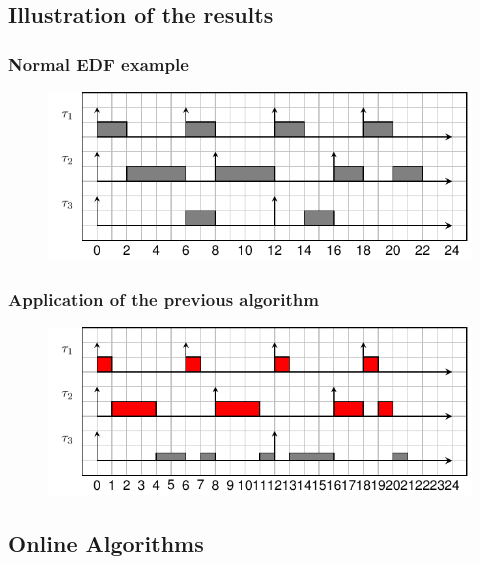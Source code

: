 \documentclass[
	11pt, %
]{beamer}
\begin{document}
\subsection{Illustration of the results}
\begin{frame}[fragile]
	\frametitle{ Normal EDF example }
	\begin{figure}
		\includegraphics{schedule/edf.pdf}
	\end{figure}
\end{frame}


\begin{frame}[fragile]
	\frametitle{ Application of the previous algorithm }
	\begin{figure}
		\includegraphics{schedule/offline_algo.pdf}
	\end{figure}
	
\end{frame}

\subsection{Online Algorithms}
\end{document}
